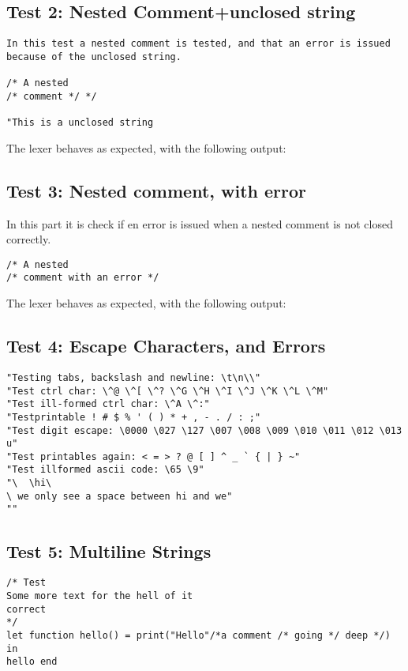 \documentclass{article}
\begin{document}
\subsection{Test 2: Nested Comment+unclosed string}
\begin{lstlisting}[frame=single]
In this test a nested comment is tested, and that an error is issued because of the unclosed string.

/* A nested
/* comment */ */

"This is a unclosed string
\end{lstlisting}

The lexer behaves as expected, with the following output:

\subsection{Test 3: Nested comment, with error}
In this part it is check if en error is issued when a nested comment is not closed correctly.

\begin{lstlisting}[frame=single]
/* A nested
/* comment with an error */ 

\end{lstlisting}

The lexer behaves as expected, with the following output:

\subsection{Test 4: Escape Characters, and Errors}



\begin{lstlisting}[frame=single]
"Testing tabs, backslash and newline: \t\n\\"
"Test ctrl char: \^@ \^[ \^? \^G \^H \^I \^J \^K \^L \^M"
"Test ill-formed ctrl char: \^A \^:"
"Testprintable ! # $ % ' ( ) * + , - . / : ;"
"Test digit escape: \0000 \027 \127 \007 \008 \009 \010 \011 \012 \013 u"
"Test printables again: < = > ? @ [ ] ^ _ ` { | } ~"
"Test illformed ascii code: \65 \9"
"\	\hi\
\ we only see a space between hi and we"
""
\end{lstlisting}

\subsection{Test 5: Multiline Strings}
\begin{lstlisting}[frame=single]
/* Test 
Some more text for the hell of it
correct
*/
let function hello() = print("Hello"/*a comment /* going */ deep */) in 
hello end
\end{lstlisting}
\end{document}
